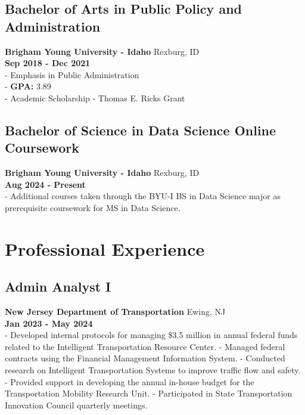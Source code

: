 \documentclass[
  letterpaper,
  DIV=11,
  numbers=noendperiod]{scrartcl}
\begin{document}
\subsection{Bachelor of Arts in Public Policy and
Administration}\label{bachelor-of-arts-in-public-policy-and-administration}

\textbf{Brigham Young University - Idaho} \textbar{} Rexburg, ID\\
\textbf{Sep 2018 - Dec 2021}\\
- Emphasis in Public Administration\\
- \textbf{GPA:} 3.89\\
- Academic Scholarship - Thomas E. Ricks Grant

\subsection{Bachelor of Science in Data Science Online
Coursework}\label{bachelor-of-science-in-data-science-online-coursework}

\textbf{Brigham Young University - Idaho} \textbar{} Rexburg, ID\\
\textbf{Aug 2024 - Present}\\
- Additional courses taken through the BYU-I BS in Data Science major as
prerequisite coursework for MS in Data Science.

\section{Professional Experience}\label{professional-experience}

\subsection{Admin Analyst I}\label{admin-analyst-i}

\textbf{New Jersey Department of Transportation} \textbar{} Ewing, NJ\\
\textbf{Jan 2023 - May 2024}\\
- Developed internal protocols for managing \$3.5 million in annual
federal funds related to the Intelligent Transportation Resource Center.
- Managed federal contracts using the Financial Management Information
System. - Conducted research on Intelligent Transportation Systems to
improve traffic flow and safety. - Provided support in developing the
annual in-house budget for the Transportation Mobility Research Unit. -
Participated in State Transportation Innovation Council quarterly
meetings.
\end{document}
